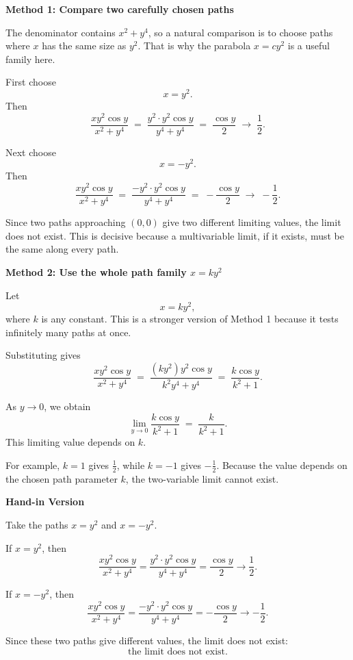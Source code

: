 \documentclass[a4paper,12pt,twocolumn]{article}
\newenvironment{solutionbox}{\begin{framed}}{\end{framed}}
\begin{document}
\begin{solutionbox}
\textbf{Method 1: Compare two carefully chosen paths}

\begin{steps}
\item The denominator contains \(x^2+y^4\), so a natural comparison is to choose paths where \(x\) has the same size as \(y^2\). That is why the parabola \(x=cy^2\) is a useful family here.

\item First choose
\[
x=y^2.
\]
Then
\[
\frac{xy^2\cos y}{x^2+y^4}
\;=\;
\frac{y^2\cdot y^2\cos y}{y^4+y^4}
\;=\;
\frac{\cos y}{2}
\;\longrightarrow\;
\frac12.
\]

\item Next choose
\[
x=-y^2.
\]
Then
\[
\frac{xy^2\cos y}{x^2+y^4}
\;=\;
\frac{-y^2\cdot y^2\cos y}{y^4+y^4}
\;=\;
-\frac{\cos y}{2}
\;\longrightarrow\;
-\frac12.
\]

\item Since two paths approaching \((0,0)\) give two different limiting values, the limit does not exist. This is decisive because a multivariable limit, if it exists, must be the same along every path.
\end{steps}
\end{solutionbox}

\begin{solutionbox}
\textbf{Method 2: Use the whole path family \(x=ky^2\)}

\begin{steps}
\item Let
\[
x=ky^2,
\]
where \(k\) is any constant. This is a stronger version of Method 1 because it tests infinitely many paths at once.

\item Substituting gives
\[
\frac{xy^2\cos y}{x^2+y^4}
\;=\;
\frac{(ky^2)y^2\cos y}{k^2y^4+y^4}
\;=\;
\frac{k\cos y}{k^2+1}.
\]

\item As \(y\to 0\), we obtain
\[
\lim_{y\to 0}\frac{k\cos y}{k^2+1}
\;=\;
\frac{k}{k^2+1}.
\]
This limiting value depends on \(k\).

\item For example, \(k=1\) gives \(\frac12\), while \(k=-1\) gives \(-\frac12\). Because the value depends on the chosen path parameter \(k\), the two-variable limit cannot exist.
\end{steps}
\end{solutionbox}

\begin{solutionbox}
\textbf{Hand-in Version}

Take the paths \(x=y^2\) and \(x=-y^2\).

If \(x=y^2\), then
\[
\frac{xy^2\cos y}{x^2+y^4}
=\frac{y^2\cdot y^2\cos y}{y^4+y^4}
=\frac{\cos y}{2}\to \frac12.
\]

If \(x=-y^2\), then
\[
\frac{xy^2\cos y}{x^2+y^4}
=\frac{-y^2\cdot y^2\cos y}{y^4+y^4}
=-\frac{\cos y}{2}\to -\frac12.
\]

Since these two paths give different values, the limit does not exist:
\[
\boxed{\text{the limit does not exist}.}
\]
\end{solutionbox}
\end{document}
